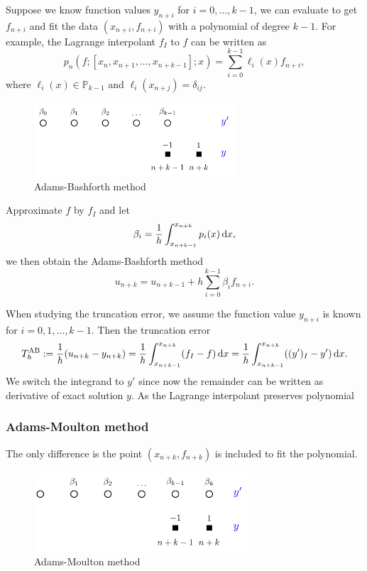\documentclass[10pt]{amsart}
\begin{document}
Suppose we know function values $y_{n+i}$ for $i=0,\ldots, k-1$, we can evaluate to get $f_{n+i}$ and fit the data $(x_{n+i}, f_{n+i})$ with a polynomial of degree $k-1$. For example, the Lagrange interpolant $f_I$ to $f$ can be written as 
$$
p_n(f; [x_{n}, x_{n+1}, \ldots, x_{n+k-1}]; x) = \sum_{i=0}^{k-1}\ell_i(x) f_{n+i},
$$
where $\ell_i(x)\in \mathbb P_{k-1}$ and $\ell_i(x_{n+j}) = \delta_{ij}$. 

\begin{figure}[htbp]
\begin{center}
\includegraphics[width=7.5cm]{figures/ABmethod.pdf}
\caption{Adams-Bashforth method}
\label{fig:multistep}
\end{center}
\end{figure}

Approximate $f$ by $f_I$ and let $$\beta_i = \frac{1}{h}\int_{x_{n+k-1}}^{x_{n+k}} p_i(x) \,{\rm d}x,$$ we then obtain the Adams-Bashforth method
\begin{equation}
u_{n+k} = u_{n+k-1} + h \sum_{i=0}^{k-1}\beta_i f_{n+i}.
\end{equation}

When studying the truncation error, we assume the function value $y_{n+i}$ is known for $i=0,1,\ldots,k-1$. Then the truncation error $$T_h^{\rm AB} := \frac{1}{h} (u_{n+k} - y_{n+k}) = \frac{1}{h} \int_{x_{n+k-1}}^{x_{n+k}} (f_I - f) \,{\rm d}x = \frac{1}{h} \int_{x_{n+k-1}}^{x_{n+k}} ((y')_I - y') \,{\rm d}x.$$
We switch the integrand to $y'$ since now the remainder can be written as derivative of exact solution $y$. As the Lagrange interpolant preserves polynomial  

\subsubsection{Adams-Moulton method}
The only difference is the point $(x_{n+k}, f_{n+k})$ is included to fit the polynomial. 
\begin{figure}[htbp]
\begin{center}
\includegraphics[width=8cm]{figures/AMmethod.pdf}
\caption{Adams-Moulton method}
\label{fig:multistep}
\end{center}
\end{figure}
\end{document}
